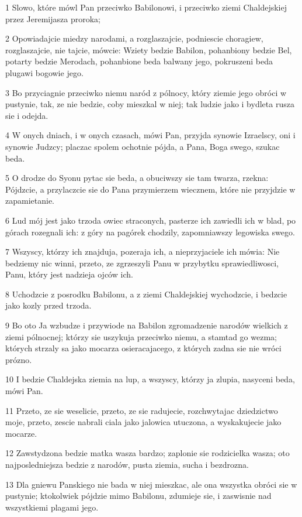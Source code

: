 \par 1 Slowo, które mówl Pan przeciwko Babilonowi, i przeciwko ziemi Chaldejskiej przez Jeremijasza proroka;
\par 2 Opowiadajcie miedzy narodami, a rozglaszajcie, podniescie choragiew, rozglaszajcie, nie tajcie, mówcie: Wziety bedzie Babilon, pohanbiony bedzie Bel, potarty bedzie Merodach, pohanbione beda balwany jego, pokruszeni beda plugawi bogowie jego.
\par 3 Bo przyciagnie przeciwko niemu naród z pólnocy, który ziemie jego obróci w pustynie, tak, ze nie bedzie, coby mieszkal w niej; tak ludzie jako i bydleta rusza sie i odejda.
\par 4 W onych dniach, i w onych czasach, mówi Pan, przyjda synowie Izraelscy, oni i synowie Judzcy; placzac spolem ochotnie pójda, a Pana, Boga swego, szukac beda.
\par 5 O drodze do Syonu pytac sie beda, a obuciwszy sie tam twarza, rzekna: Pójdzcie, a przylaczcie sie do Pana przymierzem wiecznem, które nie przyjdzie w zapamietanie.
\par 6 Lud mój jest jako trzoda owiec straconych, pasterze ich zawiedli ich w blad, po górach rozegnali ich: z góry na pagórek chodzily, zapomniawszy legowiska swego.
\par 7 Wszyscy, którzy ich znajduja, pozeraja ich, a nieprzyjaciele ich mówia: Nie bedziemy nic winni, przeto, ze zgrzeszyli Panu w przybytku sprawiedliwosci, Panu, który jest nadzieja ojców ich.
\par 8 Uchodzcie z posrodku Babilonu, a z ziemi Chaldejskiej wychodzcie, i bedzcie jako kozly przed trzoda.
\par 9 Bo oto Ja wzbudze i przywiode na Babilon zgromadzenie narodów wielkich z ziemi pólnocnej; którzy sie uszykuja przeciwko niemu, a stamtad go wezma; których strzaly sa jako mocarza osieracajacego, z których zadna sie nie wróci prózno.
\par 10 I bedzie Chaldejska ziemia na lup, a wszyscy, którzy ja zlupia, nasyceni beda, mówi Pan.
\par 11 Przeto, ze sie weselicie, przeto, ze sie radujecie, rozchwytajac dziedzictwo moje, przeto, zescie nabrali ciala jako jalowica utuczona, a wyskakujecie jako mocarze.
\par 12 Zawstydzona bedzie matka wasza bardzo; zaplonie sie rodzicielka wasza; oto najposledniejsza bedzie z narodów, pusta ziemia, sucha i bezdrozna.
\par 13 Dla gniewu Panskiego nie bada w niej mieszkac, ale ona wszystka obróci sie w pustynie; ktokolwiek pójdzie mimo Babilonu, zdumieje sie, i zaswisnie nad wszystkiemi plagami jego.
